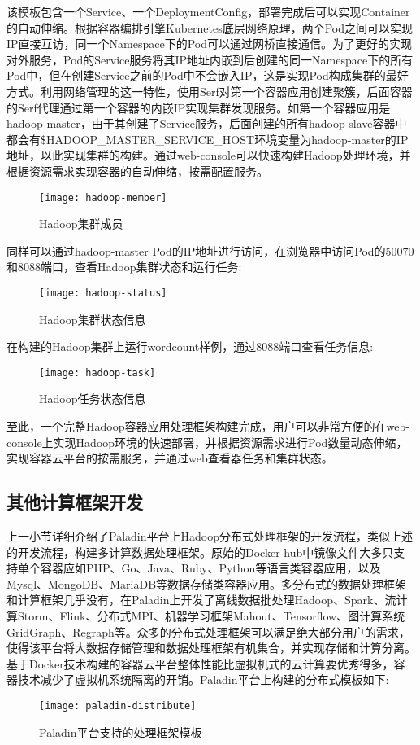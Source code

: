 该模板包含一个Service、一个DeploymentConfig，部署完成后可以实现Container的自动伸缩。根据容器编排引擎Kubernetes底层网络原理，两个Pod之间可以实现IP直接互访，同一个Namespace下的Pod可以通过网桥直接通信。为了更好的实现对外服务，Pod的Service服务将其IP地址内嵌到后创建的同一Namespace下的所有Pod中，但在创建Service之前的Pod中不会嵌入IP，这是实现Pod构成集群的最好方式。利用网络管理的这一特性，使用Serf对第一个容器应用创建聚簇，后面容器的Serf代理通过第一个容器的内嵌IP实现集群发现服务。如第一个容器应用是hadoop-master，由于其创建了Service服务，后面创建的所有hadoop-slave容器中都会有\$HADOOP\_MASTER\_SERVICE\_HOST环境变量为hadoop-master的IP地址，以此实现集群的构建。通过web-console可以快速构建Hadoop处理环境，并根据资源需求实现容器的自动伸缩，按需配置服务。
\begin{figure}[H] %
	\centering
	\texttt{[image: hadoop-member]}
	\caption{Hadoop集群成员}
\end{figure}

同样可以通过hadoop-master Pod的IP地址进行访问，在浏览器中访问Pod的50070和8088端口，查看Hadoop集群状态和运行任务:
\begin{figure}[H] %
	\centering
	\texttt{[image: hadoop-status]}
	\caption{Hadoop集群状态信息}
\end{figure}
在构建的Hadoop集群上运行wordcount样例，通过8088端口查看任务信息:
\begin{figure}[H] %
	\centering
	\texttt{[image: hadoop-task]}
	\caption{Hadoop任务状态信息}
\end{figure}

至此，一个完整Hadoop容器应用处理框架构建完成，用户可以非常方便的在web-console上实现Hadoop环境的快速部署，并根据资源需求进行Pod数量动态伸缩，实现容器云平台的按需服务，并通过web查看器任务和集群状态。

\subsection{其他计算框架开发}
上一小节详细介绍了Paladin平台上Hadoop分布式处理框架的开发流程，类似上述的开发流程，构建多计算数据处理框架。原始的Docker hub中镜像文件大多只支持单个容器应如PHP、Go、Java、Ruby、Python等语言类容器应用，以及Mysql、MongoDB、MariaDB等数据存储类容器应用。多分布式的数据处理框架和计算框架几乎没有，在Paladin上开发了离线数据批处理Hadoop、Spark、流计算Storm、Flink、分布式MPI、机器学习框架Mahout、Tensorflow、图计算系统GridGraph、Regraph等。众多的分布式处理框架可以满足绝大部分用户的需求，使得该平台将大数据存储管理和数据处理框架有机集合，并实现存储和计算分离。基于Docker技术构建的容器云平台整体性能比虚拟机式的云计算要优秀得多，容器技术减少了虚拟机系统隔离的开销。Paladin平台上构建的分布式模板如下:
\begin{figure}[H] %
	\centering
	\texttt{[image: paladin-distribute]}
	\caption{Paladin平台支持的处理框架模板}
\end{figure}

